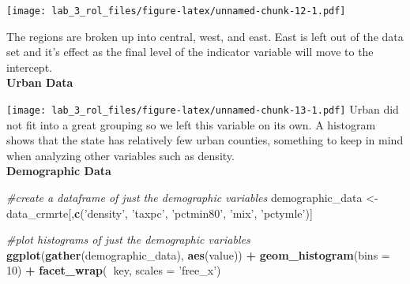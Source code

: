 \documentclass[
]{article}
\newenvironment{Shaded}{\begin{snugshade}}{\end{snugshade}}
\newcommand{\CommentTok}[1]{\textcolor[rgb]{0.56,0.35,0.01}{\textit{#1}}}
\newcommand{\DataTypeTok}[1]{\textcolor[rgb]{0.13,0.29,0.53}{#1}}
\newcommand{\DecValTok}[1]{\textcolor[rgb]{0.00,0.00,0.81}{#1}}
\newcommand{\KeywordTok}[1]{\textcolor[rgb]{0.13,0.29,0.53}{\textbf{#1}}}
\newcommand{\NormalTok}[1]{#1}
\newcommand{\OperatorTok}[1]{\textcolor[rgb]{0.81,0.36,0.00}{\textbf{#1}}}
\newcommand{\StringTok}[1]{\textcolor[rgb]{0.31,0.60,0.02}{#1}}
\begin{document}
\texttt{[image: lab\_3\_rol\_files/figure-latex/unnamed-chunk-12-1.pdf]}

\begin{Shaded}
\end{Shaded}

The regions are broken up into central, west, and east. East is left out
of the data set and it's effect as the final level of the indicator
variable will move to the intercept.\\

\textbf{Urban Data}\\

\begin{Shaded}
\end{Shaded}

\texttt{[image: lab\_3\_rol\_files/figure-latex/unnamed-chunk-13-1.pdf]}
Urban did not fit into a great grouping so we left this variable on its
own. A histogram shows that the state has relatively few urban counties,
something to keep in mind when analyzing other variables such as
density.\\

\textbf{Demographic Data}\\

\begin{Shaded}
\begin{Highlighting}[]
\CommentTok{#create a dataframe of just the demographic variables}
\NormalTok{demographic_data <-}\StringTok{ }\NormalTok{data_crmrte[,}\KeywordTok{c}\NormalTok{(}\StringTok{'density'}\NormalTok{, }\StringTok{'taxpc'}\NormalTok{, }\StringTok{'pctmin80'}\NormalTok{,}
                                   \StringTok{'mix'}\NormalTok{, }\StringTok{'pctymle'}\NormalTok{)]}

\CommentTok{#plot histograms of just the demographic variables}
\KeywordTok{ggplot}\NormalTok{(}\KeywordTok{gather}\NormalTok{(demographic_data), }\KeywordTok{aes}\NormalTok{(value)) }\OperatorTok{+}\StringTok{ }
\StringTok{  }\KeywordTok{geom_histogram}\NormalTok{(}\DataTypeTok{bins =} \DecValTok{10}\NormalTok{) }\OperatorTok{+}\StringTok{ }
\StringTok{  }\KeywordTok{facet_wrap}\NormalTok{(}\OperatorTok{~}\NormalTok{key, }\DataTypeTok{scales =} \StringTok{'free_x'}\NormalTok{)}
\end{Highlighting}
\end{Shaded}
\end{document}
